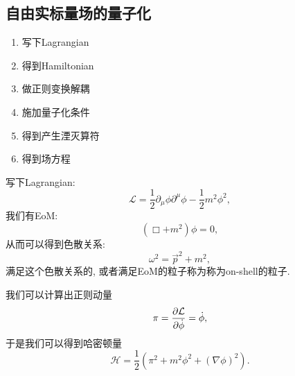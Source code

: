 \subsection{自由实标量场的量子化\label{2nd_quant_free_real_scalar}}
\begin{enumerate}
    \item 写下Lagrangian
    \item 得到Hamiltonian
    \item 做正则变换解耦
    \item 施加量子化条件
    \item 得到产生湮灭算符
    \item 得到场方程
\end{enumerate}

写下Lagrangian:
\begin{equation}
    \mathcal L=\frac12\partial_\mu\phi\partial^\mu\phi - \frac12 m^2\phi^2,
\end{equation}
我们有EoM:
\begin{equation}
    (\Box+m^2)\phi = 0,
\end{equation}
从而可以得到色散关系:
\begin{equation}
    \omega^2=\vec p^2+m^2,
\end{equation}
满足这个色散关系的, 或者满足EoM的粒子称为称为on-shell的粒子.

我们可以计算出正则动量
\begin{align}
    \pi=\frac{\partial \mathcal L}{\partial \dot\phi}=\dot\phi,
\end{align}
于是我们可以得到哈密顿量
\begin{equation}
    \mathcal H=\frac12(\pi^2+m^2\phi^2+(\nabla\phi)^2).
\end{equation}


